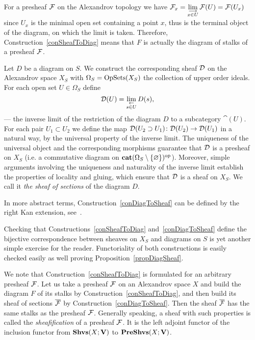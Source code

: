 \begin{rem}
For a presheaf $\mathcal{F}$ on the Alexandrov topology we have $\mathcal{F}_x=\lim\limits_{\substack{\longrightarrow\\x\in U}}\mathcal{F}(U)=\mathcal{F}(U_x)$ since $U_x$ is the minimal open set containing a point $x$, thus is the terminal object of the diagram, on which the limit is taken. Therefore, Construction~\ref{conSheafToDiag} means that $F$ is actually the diagram of stalks of a presheaf $\mathcal{F}$.
\end{rem}

\begin{con}\label{conDiagToSheaf}
Let $D$ be a diagram on $S$. We construct the corresponding sheaf $\mathcal{D}$ on the Alexandrov space $X_S$ with $\Omega_S=\operatorname{OpSets}(X_S)$ the collection of upper order ideals. For each open set $U\in\Omega_S$ define
\begin{equation}\label{eqSheafFromDiagram}
\mathcal{D}(U)=\lim\limits_{\substack{\leftarrow \\ s\in U}}D(s),
\end{equation}
--- the inverse limit of the restriction of the diagram $D$ to a subcategory $\cat(U)$. For each pair $U_1\subset U_2$ we define the map $\mathcal{D}(U_2\supset U_1)\colon \mathcal{D}(U_2)\to \mathcal{D}(U_1)$ in a natural way, by the universal property of the inverse limit. The uniqueness of the universal object and the corresponding morphisms guarantee that $\mathcal{D}$ is a presheaf on $X_S$ (i.e. a commutative diagram on $\mathbf{cat}(\Omega_S\setminus\{\varnothing\})^{\operatorname{op}}$). Moreover, simple arguments involving the uniqueness and naturality of the inverse limit establish the properties of locality and gluing, which ensure that $\mathcal{D}$ is a sheaf on $X_S$. We call it \emph{the sheaf of sections} of the diagram $D$.
\end{con}

\begin{rem}
In more abstract terms, Construction~\ref{conDiagToSheaf} can be defined by the right Kan extension, see~\cite[Theorem 4.2.10]{Curry}.
\end{rem}

Checking that Constructions~\ref{conSheafToDiag} and~\ref{conDiagToSheaf} define the bijective correspondence between sheaves on $X_S$ and diagrams on $S$ is yet another simple exercise for the reader. Functoriality of both constructions is easily checked easily as well proving Proposition~\ref{propDiagSheaf}.

\begin{rem}\label{remSheafification}
We note that Construction~\ref{conSheafToDiag} is formulated for an arbitrary presheaf $\mathcal{F}$. Let us take a presheaf $\mathcal{F}$ on an Alexandrov space $X$ and build the diagram $F$ of its stalks by Construction~\ref{conSheafToDiag}, and then build its sheaf of sections $\overline{\mathcal{F}}$ by Construction~\ref{conDiagToSheaf}. Then the sheaf $\overline{\mathcal{F}}$ has the same stalks as the presheaf $\mathcal{F}$. Generally speaking, a sheaf with such properties is called the \emph{sheafification} of a presheaf $\mathcal{F}$. It is the left adjoint functor of the inclusion functor from $\mathbf{Shvs}(X;\mathbf{V})$ to $\mathbf{PreShvs}(X;\mathbf{V})$.
\end{rem}


